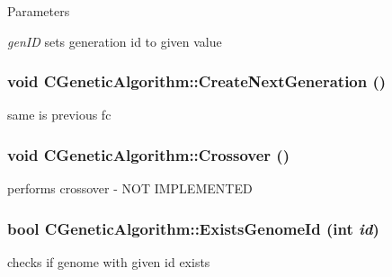 \begin{DoxyParams}{Parameters}
\item[{\em genID}]sets generation id to given value \end{DoxyParams}
\hypertarget{classCGeneticAlgorithm_a6d5ea989deb69d8ee444db30d6e7fe67}{
\subsubsection[{CreateNextGeneration}]{\setlength{\rightskip}{0pt plus 5cm}void CGeneticAlgorithm::CreateNextGeneration ()}}
\label{classCGeneticAlgorithm_a6d5ea989deb69d8ee444db30d6e7fe67}
same is previous fc \hypertarget{classCGeneticAlgorithm_a8a74507a0e02509a46e31377772d0399}{
\subsubsection[{Crossover}]{\setlength{\rightskip}{0pt plus 5cm}void CGeneticAlgorithm::Crossover ()}}
\label{classCGeneticAlgorithm_a8a74507a0e02509a46e31377772d0399}
performs crossover -\/ NOT IMPLEMENTED \hypertarget{classCGeneticAlgorithm_a443bd2417f915c0aeb8119ff86844ad4}{
\subsubsection[{ExistsGenomeId}]{\setlength{\rightskip}{0pt plus 5cm}bool CGeneticAlgorithm::ExistsGenomeId (int {\em id})}}
\label{classCGeneticAlgorithm_a443bd2417f915c0aeb8119ff86844ad4}
checks if genome with given id exists


